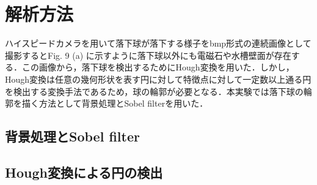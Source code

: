 \chapter{解析方法}
ハイスピードカメラを用いて落下球が落下する様子をbmp形式の連続画像として撮影するとFig. 9 (a) に示すように落下球以外にも電磁石や水槽壁面が存在する．この画像から，落下球を検出するためにHough変換を用いた．しかし，Hough変換は任意の幾何形状を表す円に対して特徴点に対して一定数以上通る円を検出する変換手法であるため，球の輪郭が必要となる．本実験では落下球の輪郭を描く方法として背景処理とSobel filterを用いた．
\section{背景処理とSobel filter}
\section{Hough変換による円の検出}